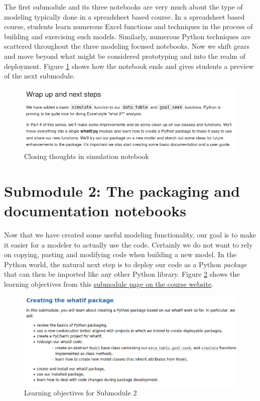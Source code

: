 \documentclass[ited]{informs3}                      %
\begin{document}
The first submodule and its three notebooks are very much about the type of modeling typically done in a spreadsheet based course. In a spreadsheet based course, students learn numerous Excel functions and techniques in the process of building and exercising such models. Similarly, numerous Python techniques are scattered throughout the three modeling focused notebooks. Now we shift gears and move beyond what might be considered prototyping and into the realm of deployment. Figure \ref{fig:sim_wrapup} shows how the notebook ends and gives students a preview of the next submodule.

\begin{figure}[!htbp]
\centering
\includegraphics[scale=0.5]{images/sim_wrapup}
\caption{Closing thoughts in simulation notebook}
\label{fig:sim_wrapup}
\end{figure}

\section{Submodule 2: The packaging and documentation notebooks}

Now that we have created some useful modeling functionality, our goal is to make it easier for a modeler to actually use the code. Certainly we do not want to rely on copying, pasting and modifying code when building a new model. In the Python world, the natural next step is to deploy our code as a Python \textit{package} \citep{buezenWelcomePythonPackages2022} that can then be imported like any other Python library. Figure \ref{fig:objectives_packaging} shows the learning objectives from this \href{http://www.sba.oakland.edu/faculty/isken/courses/aap/mod3b_whatif_packaging.html}{submodule page on the course website}.

\begin{figure}[!htbp]
	\centering
	\includegraphics[scale=0.5]{images/objectives_packaging}
	\caption{Learning objectives for Submodule 2}
	\label{fig:objectives_packaging}
\end{figure}
\end{document}
